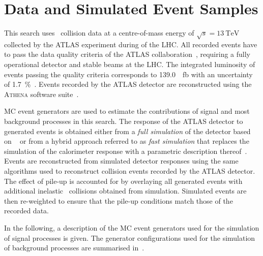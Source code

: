 \section{Data and Simulated Event Samples}%
\label{sec:data_and_simulation}

This search uses \pp~collision data at a centre-of-mass energy of
$\sqrt{s} = \SI{13}{\TeV}$ collected by the ATLAS experiment during \RunTwo of
the LHC. All recorded events have to pass the data quality criteria of the ATLAS
collaboration~\cite{DAPR-2018-01}, requiring a fully operational detector and
stable beams at the LHC. The integrated luminosity of events passing the quality
criteria corresponds to \SI{139.0}{\per\femto\barn} with an uncertainty of
\SI{1.7}{\percent}~\cite{ATLAS-CONF-2019-021}. Events recorded by the ATLAS
detector are reconstructed using the \textsc{Athena} software
suite~\cite{ATL-SOFT-PUB-2021-001}.


MC event generators are used to estimate the contributions of signal and most
background processes in this search. The response of the ATLAS detector to
generated events is obtained either from a \emph{full simulation} of the
detector based on \GEANT~\cite{SOFT-2010-01,Agostinelli:2002hh} or from a hybrid
approach referred to as \emph{fast simulation} that replaces the simulation of
the calorimeter response with a parametric description
thereof~\cite{SOFT-2010-01}. Events are reconstructed from simulated detector
responses using the same algorithms used to reconstruct collision events
recorded by the ATLAS detector. The effect of pile-up is accounted for by
overlaying all generated events with additional inelastic \pp~collisions
obtained from simulation. Simulated events are then re-weighted to ensure that
the pile-up conditions match those of the recorded data.

In the following, a description of the MC event generators used for the
simulation of signal processes is given. The generator configurations used for
the simulation of background processes are summarised in~.

